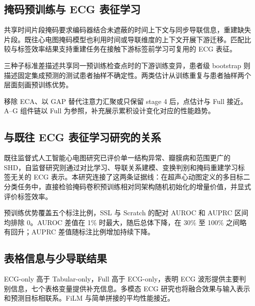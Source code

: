 \subsection{掩码预训练与 ECG 表征学习}
\label{sec:discussion_representation}

共享时间片段掩码要求编码器结合未遮蔽的时间上下文与同步导联信息，重建缺失片段。既往心电图掩码模型也利用时间或导联维度的上下文开展下游迁移\cite{zhang2023maefe,na2024stmem,ran_joint_masking_2024,sawano_masked_lvsd_2024}。匹配比较与标签效率结果支持重建任务在接触下游标签前学习可复用的 ECG 表征。

三种子标准差描述共享同一预训练检查点时的下游训练变异，患者级 bootstrap 则描述固定集成预测的测试患者抽样不确定性。两类估计从训练重复与患者抽样两个层面刻画预训练优势。

移除 ECA、以 GAP 替代注意力汇聚或只保留 stage 4 后，点估计与 Full 接近。A--G 组件链以 Full 为参照，补充展示累积设计变化对应的性能趋势。

\subsection{与既往 ECG 表征学习研究的关系}
\label{sec:discussion_prior}

既往监督式人工智能心电图研究已评价单一结构异常、瓣膜病和范围更广的 SHD\cite{attia2019contractile,elias2022valvenet,ulloacerna2022rechommend,poterucha2025echonext,dhingra_present_shd_2025}，自监督研究则通过对比学习、导联关系建模、变换判别和掩码重建学习标签无关的 ECG 表示\cite{kiyasseh2021clocs,mehari2022ssl,oh2022leadagnostic,zhang_reverse_2023,zhang2023maefe,na2024stmem}。本研究连接了这两条证据线：在超声心动图定义的多目标二分类任务中，直接检验掩码卷积预训练相对同架构随机初始化的增量价值，并显式评价标签效率。

预训练优势覆盖五个标注比例，SSL 与 Scratch 的配对 AUROC 和 AUPRC 区间均排除 0。AUROC 差值在 1\% 时最大，随后总体下降，在 30\% 至 100\% 之间略有回升；AUPRC 差值随标注比例增加持续下降。

\subsection{表格信息与少导联结果}
\label{sec:discussion_secondary}

ECG-only 高于 Tabular-only，Full 高于 ECG-only，表明 ECG 波形提供主要判别信息，七个表格变量提供补充信息。多模态 ECG 研究也将融合效果与输入表示和预测目标相联系\cite{jiang_multimodal_lqts_2024,narotamo_multimodal_2024}。FiLM 与简单拼接的平均性能接近。

